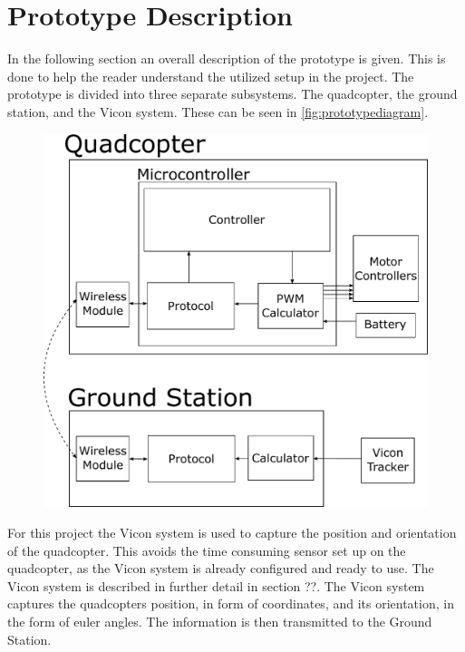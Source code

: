 \section{Prototype Description}
In the following section an overall description of the prototype is given. This is done to help the reader understand the utilized setup in the project.
The prototype is divided into three separate subsystems. The quadcopter, the ground station, and the Vicon system. These can be seen in \autoref{fig:prototypediagram}. 

\begin{figure}[H] 
	\includegraphics[scale=.5]{figures/prototypediagram}
	\centering
	\captionsetup{justification=centering}
	\label{fig:prototypediagram}
\end{figure}


For this project the Vicon system is used to capture the position and orientation of the quadcopter. This avoids the time consuming sensor set up on the quadcopter, as the Vicon system is already configured and ready to use. The Vicon system is described in further detail in section ??. The Vicon system captures the quadcopters position, in form of coordinates, and its orientation, in the form of euler angles. The information is then transmitted to the Ground Station.

